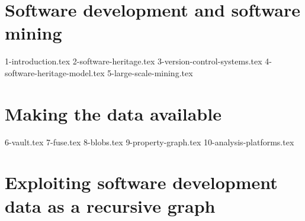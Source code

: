 \documentclass[a4paper,11pt,openbib,draft]{memoir}
\begin{document}
\raggedbottom

\frontmatter
{}
%

\clearemptydoublepage

%

\clearemptydoublepage
%

\clearemptydoublepage
%


\renewcommand{\contentsname}{Table of Contents}
\tableofcontents*
{}
%

\iffalse
\listoftables
\addtocontents{lot}{\par\nobreak\textbf{{\scshape Table} \hfill Page}\par\nobreak}
\clearemptydoublepage
\listoffigures
\addtocontents{lof}{\par\nobreak\textbf{{\scshape Figure} \hfill Page}\par\nobreak}
\clearemptydoublepage
\fi
%
%
\mainmatter
%


\part{Software development and software mining}

{1-introduction.tex}
{2-software-heritage.tex}
{3-version-control-systems.tex}
{4-software-heritage-model.tex}
{5-large-scale-mining.tex}

\iffalse
\part{Making the data available}

{6-vault.tex}
{7-fuse.tex}
{8-blobs.tex}
{9-property-graph.tex}
{10-analysis-platforms.tex}

\part{Exploiting software development data as a recursive graph}
\end{document}
